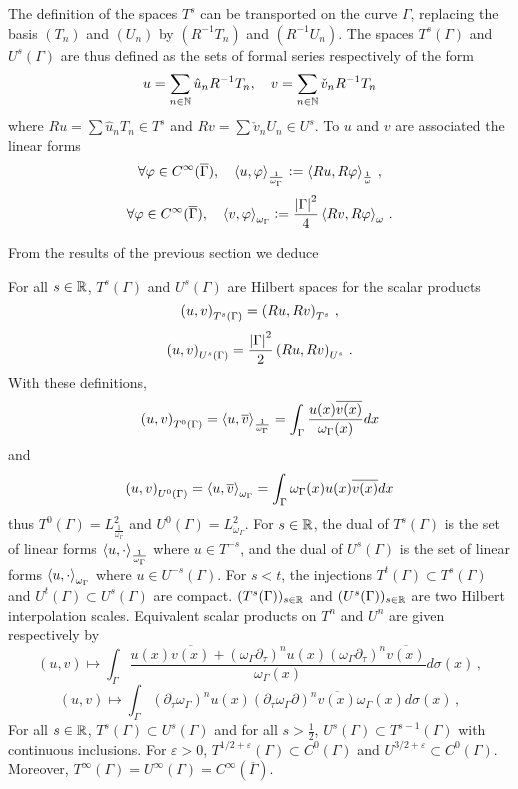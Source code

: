 \documentclass[a4paper]{article}
\begin{document}
The definition of the spaces $T^s$ can be transported on the curve $\Gamma$, replacing the basis $(T_n)$ and $(U_n)$ by $(R^{-1}T_n)$ and $(R^{-1}U_n)$. The spaces $T^s(\Gamma)$ and $U^s(\Gamma)$ are thus defined as the sets of formal series respectively of the form 
\[u = \sum_{n \in \mathbb{N}} \hat{u}_n R^{-1}T_n, \quad v = \sum_{n \in \mathbb{N}} \check{v}_n R^{-1}T_n\]
where $Ru = \sum\hat{u}_n T_n \in T^s$ and $Rv = \sum\check{v}_n U_n  \in U^s$. To $u$ and $v$ are associated the linear forms 
\[\forall \varphi \in C^{\infty}(\overline{\Gamma}), \quad \left\langle u,\varphi\right\rangle_\frac{1}{\omega_\Gamma} \mathrel{\mathop:}= \left\langle Ru,R\varphi\right\rangle_\frac{1}{\omega}\,,\]
\[\forall \varphi \in C^{\infty}(\overline{\Gamma}), \quad \left\langle v,\varphi\right\rangle_{\omega_\Gamma} \mathrel{\mathop:}= \frac{\left\lvert \Gamma \right\rvert^2}{4}\left\langle Rv,R\varphi\right\rangle_{\omega}\,.\] 

 
\noindent From the results of the previous section we deduce
\begin{Lem} For all $s \in \mathbb{R}$, $T^s(\Gamma)$ and $U^s(\Gamma)$ are Hilbert spaces for the scalar products 
\[\left( u,v\right)_{T^s(\Gamma)} = \left( Ru,Rv\right)_{T^s}\,,\]
\[\left( u,v\right)_{U^s(\Gamma)} = \frac{\left\lvert \Gamma \right\rvert^2}{2}\left( Ru,Rv\right)_{U^s}\,.\]
With these definitions, 
\[\left( u,v\right)_{T^0(\Gamma)} = \left\langle u,\overline{v}\right\rangle_\frac{1}{\omega_\Gamma} = \int_{\Gamma} \frac{u(x) \overline{v(x)}}{ \omega_\Gamma(x)} dx\]
and
\[\left( u,v\right)_{U^0(\Gamma)} = \left\langle u,\overline{v}\right\rangle_{\omega_\Gamma}  = \int_{\Gamma} \omega_\Gamma(x) u(x) \overline{v(x)} dx\]
thus $T^0(\Gamma) = L^2_\frac{1}{\omega_\Gamma}$ and $U^0(\Gamma) = L^2_{\omega_\Gamma}$. For $s \in \mathbb{R}$, the dual of $T^s(\Gamma)$ is the set of linear forms $\left\langle u,\cdot\right\rangle_\frac{1}{\omega_\Gamma}$ where $u\in T^{-s}$, and the dual of $U^s(\Gamma)$ is the set of linear forms $\left\langle u,\cdot\right\rangle_{\omega_\Gamma}$ where $u \in U^{-s}(\Gamma)$. 
For $s < t$, the injections $T^t(\Gamma) \subset T^s(\Gamma)$ and $U^t(\Gamma) \subset U^s(\Gamma)$ are compact. $(T^s(\Gamma))_{s\in \mathbb{R}}$ and $(U^s(\Gamma))_{s\in \mathbb{R}}$ are two Hilbert interpolation scales. Equivalent scalar products on $T^n$ and $U^n$ are given respectively by
\[(u,v) \mapsto \int_{\Gamma} \frac{u(x)\overline{v(x)} + (\omega_\Gamma \partial_\tau)^n u(x) (\omega_\Gamma \partial_\tau)^n \overline{v(x)}}{\omega_\Gamma(x)}d\sigma(x)\,,\]
\[(u,v) \mapsto \int_{\Gamma}(\partial_\tau\omega_\Gamma )^n u(x) (\partial_\tau\omega_\Gamma \partial)^n \overline{v(x)}\omega_\Gamma(x)d\sigma(x)\,,\]
For all $s \in \mathbb{R}$, $T^s(\Gamma) \subset U^s(\Gamma)$ and for all $s > \frac{1}{2}$, $U^s(\Gamma) \subset T^{s-1}(\Gamma)$ with continuous inclusions. For $\varepsilon > 0$, $T^{1/2 + \varepsilon}(\Gamma) \subset C^0(\Gamma)$ and $U^{3/2+\varepsilon} \subset C^0(\Gamma)$. Moreover, $T^\infty(\Gamma) = U^\infty(\Gamma) = C^\infty(\overline{\Gamma})$. 
\end{Lem}
\end{document}
